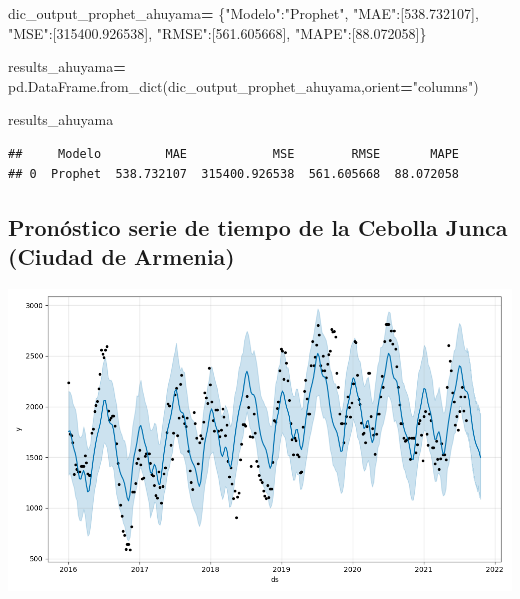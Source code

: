 \documentclass[
]{book}
\newenvironment{Shaded}{\begin{snugshade}}{\end{snugshade}}
\newcommand{\FloatTok}[1]{\textcolor[rgb]{0.00,0.00,0.81}{#1}}
\newcommand{\NormalTok}[1]{#1}
\newcommand{\OperatorTok}[1]{\textcolor[rgb]{0.81,0.36,0.00}{\textbf{#1}}}
\newcommand{\StringTok}[1]{\textcolor[rgb]{0.31,0.60,0.02}{#1}}
\begin{document}
\begin{Shaded}
\begin{Highlighting}[]

\NormalTok{dic\_output\_prophet\_ahuyama}\OperatorTok{=}\NormalTok{ \{}\StringTok{"Modelo"}\NormalTok{:}\StringTok{"Prophet"}\NormalTok{,}
                 \StringTok{"MAE"}\NormalTok{:[}\FloatTok{538.732107}\NormalTok{],}
                 \StringTok{"MSE"}\NormalTok{:[}\FloatTok{315400.926538}\NormalTok{],}
                 \StringTok{"RMSE"}\NormalTok{:[}\FloatTok{561.605668}\NormalTok{],}
                 \StringTok{"MAPE"}\NormalTok{:[}\FloatTok{88.072058}\NormalTok{]\}}

\NormalTok{results\_ahuyama}\OperatorTok{=}\NormalTok{ pd.DataFrame.from\_dict(dic\_output\_prophet\_ahuyama,orient}\OperatorTok{=}\StringTok{"columns"}\NormalTok{)}

\NormalTok{results\_ahuyama}
\end{Highlighting}
\end{Shaded}

\begin{verbatim}
##     Modelo         MAE            MSE        RMSE       MAPE
## 0  Prophet  538.732107  315400.926538  561.605668  88.072058
\end{verbatim}

\hypertarget{pronuxf3stico-serie-de-tiempo-de-la-cebolla-junca-ciudad-de-armenia-2}{%
\subsection{Pronóstico serie de tiempo de la Cebolla Junca (Ciudad de Armenia)}\label{pronuxf3stico-serie-de-tiempo-de-la-cebolla-junca-ciudad-de-armenia-2}}

\includegraphics{Prophet_Cebolla_AXM.png}
\end{document}

